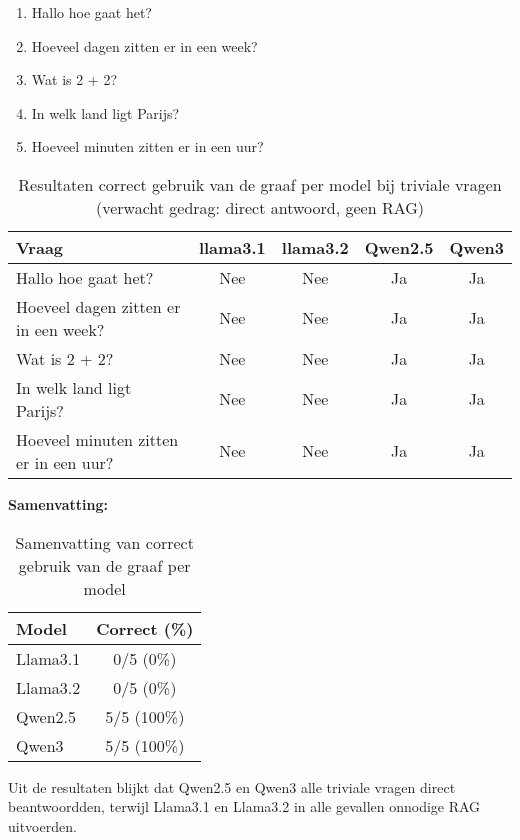 \begin{enumerate}
    \item Hallo hoe gaat het?
    \item Hoeveel dagen zitten er in een week?
    \item Wat is 2 + 2?
    \item In welk land ligt Parijs?
    \item Hoeveel minuten zitten er in een uur?
\end{enumerate}

\begin{table}[H]
    \centering
    \begin{tabular}{|l|c|c|c|c|}
        \hline
        \textbf{Vraag} & \textbf{llama3.1} & \textbf{llama3.2} & \textbf{Qwen2.5} & \textbf{Qwen3} \\
        \hline
        Hallo hoe gaat het? & Nee & Nee & Ja & Ja \\
        Hoeveel dagen zitten er in een week? & Nee & Nee & Ja & Ja \\
        Wat is 2 + 2? & Nee & Nee & Ja & Ja \\
        In welk land ligt Parijs? & Nee & Nee & Ja & Ja \\
        Hoeveel minuten zitten er in een uur? & Nee & Nee & Ja & Ja \\
        \hline
    \end{tabular}
    \caption{Resultaten correct gebruik van de graaf per model bij triviale vragen (verwacht gedrag: direct antwoord, geen RAG)}
\end{table}

\noindent\textbf{Samenvatting:}  
\begin{table}[H]
    \begin{tabular}{|l|c|}
        \hline
        \textbf{Model} & \textbf{Correct (\%)} \\
        \hline
        Llama3.1 & 0/5 (0\%) \\
        Llama3.2 & 0/5 (0\%) \\
        Qwen2.5  & 5/5 (100\%) \\
        Qwen3    & 5/5 (100\%) \\
        \hline
    \end{tabular}
    \caption{Samenvatting van correct gebruik van de graaf per model}
\end{table}

Uit de resultaten blijkt dat Qwen2.5 en Qwen3 alle triviale vragen direct beantwoordden, terwijl Llama3.1 en Llama3.2 in alle gevallen onnodige RAG uitvoerden.


